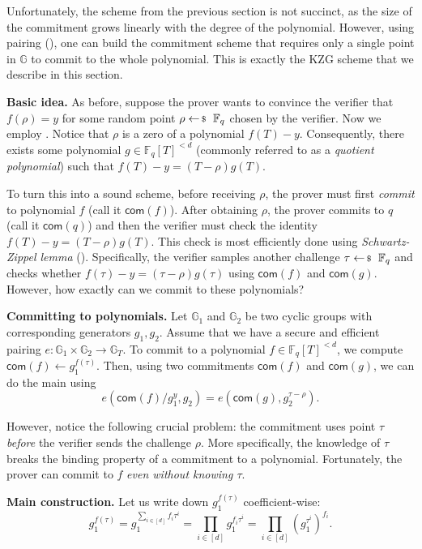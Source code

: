 \documentclass[../../book]{subfiles}
\begin{document}
Unfortunately, the scheme from the previous section is not succinct, as the size of the commitment grows linearly with the degree of the polynomial.
However, using pairing (), one can build the commitment scheme that requires only a single point in $\mathbb{G}$ to commit to the whole polynomial.
This is exactly the KZG scheme that we describe in this section.

\textbf{Basic idea.} As before, suppose the prover wants to convince the verifier that $f(\rho)=y$ for some random point $\rho \leftarrowS \mathbb{F}_q$ chosen by the verifier.
Now we employ . Notice that $\rho$ is a zero of a polynomial $f(T)-y$. 
Consequently, there exists some polynomial $g \in \mathbb{F}_q[T]^{<d}$ (commonly referred to as a \emph{quotient polynomial}) such that $f(T)-y = (T-\rho)g(T)$.

To turn this into a sound scheme, before receiving $\rho$, the prover must first \emph{commit} to polynomial $f$ (call it $\mathsf{com}(f)$).
After obtaining $\rho$, the prover commits to $q$ (call it $\mathsf{com}(q)$) and then the verifier must check the identity $f(T)-y = (T-\rho)g(T)$.
This check is most efficiently done using \textit{Schwartz-Zippel lemma} ().
Specifically, the verifier samples another challenge $\tau \leftarrowS \mathbb{F}_q$ and checks whether $f(\tau)-y=(\tau-\rho)g(\tau)$ using $\mathsf{com}(f)$ and $\mathsf{com}(g)$.
However, how exactly can we commit to these polynomials?

\textbf{Committing to polynomials.} Let $\mathbb{G}_1$ and $\mathbb{G}_2$ be two cyclic groups with corresponding generators $g_1,g_2$.
Assume that we have a secure and efficient pairing $e: \mathbb{G}_1 \times \mathbb{G}_2 \to \mathbb{G}_T$.
To commit to a polynomial $f \in \mathbb{F}_q[T]^{<d}$, we compute $\mathsf{com}(f) \gets g_1^{f(\tau)}$.
Then, using two commitments $\mathsf{com}(f)$ and $\mathsf{com}(g)$, we can do the main using
\begin{equation*}
    e(\mathsf{com}(f)/g_1^y, g_2) = e(\mathsf{com}(g), g_2^{\tau-\rho}).
\end{equation*}

However, notice the following crucial problem: the commitment uses point $\tau$ \emph{before} the verifier sends the challenge $\rho$.
More specifically, the knowledge of $\tau$ breaks the binding property of a commitment to a polynomial.
Fortunately, the prover can commit to $f$ \emph{even without knowing $\tau$}.

\textbf{Main construction.} Let us write down $g_1^{f(\tau)}$ coefficient-wise:
\begin{equation*}
    g_1^{f(\tau)} = g_1^{\sum_{i \in [d]}f_i\tau^i} = \prod_{i \in [d]}g_1^{f_i\tau^i} = \prod_{i \in [d]}(g_1^{\tau^i})^{f_i}.
\end{equation*}
\end{document}

